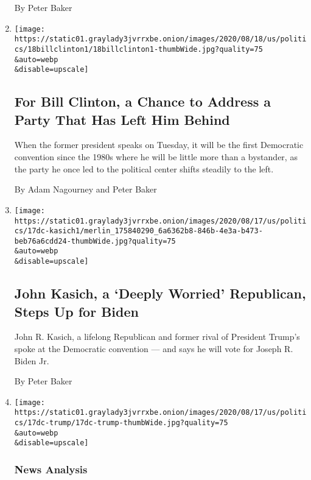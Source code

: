 \begin{enumerate}
  By Peter Baker
\item
  \href{/2020/08/18/us/politics/bill-clinton-convention.html}{}

  \texttt{[image: https://static01.graylady3jvrrxbe.onion/images/2020/08/18/us/politics/18billclinton1/18billclinton1-thumbWide.jpg?quality=75\\\&auto=webp\\\&disable=upscale]}

  \hypertarget{for-bill-clinton-a-chance-to-address-a-party-that-has-left-him-behind}{%
  \subsection{For Bill Clinton, a Chance to Address a Party That Has
  Left Him
  Behind}\label{for-bill-clinton-a-chance-to-address-a-party-that-has-left-him-behind}}

  When the former president speaks on Tuesday, it will be the first
  Democratic convention since the 1980s where he will be little more
  than a bystander, as the party he once led to the political center
  shifts steadily to the left.

  By Adam Nagourney and Peter Baker
\item
  \href{/2020/08/17/us/politics/john-kasich-biden.html}{}

  \texttt{[image: https://static01.graylady3jvrrxbe.onion/images/2020/08/17/us/politics/17dc-kasich1/merlin\_175840290\_6a6362b8-846b-4e3a-b473-beb76a6cdd24-thumbWide.jpg?quality=75\\\&auto=webp\\\&disable=upscale]}

  \hypertarget{john-kasich-a-deeply-worried-republican-steps-up-for-biden}{%
  \subsection{John Kasich, a `Deeply Worried' Republican, Steps Up for
  Biden}\label{john-kasich-a-deeply-worried-republican-steps-up-for-biden}}

  John R. Kasich, a lifelong Republican and former rival of President
  Trump's spoke at the Democratic convention --- and says he will vote
  for Joseph R. Biden Jr.

  By Peter Baker
\item
  \href{/2020/08/17/us/politics/trump-election.html}{}

  \texttt{[image: https://static01.graylady3jvrrxbe.onion/images/2020/08/17/us/politics/17dc-trump/17dc-trump-thumbWide.jpg?quality=75\\\&auto=webp\\\&disable=upscale]}

  \hypertarget{news-analysis-1}{%
  \subsubsection{News Analysis}\label{news-analysis-1}}


\end{enumerate}

